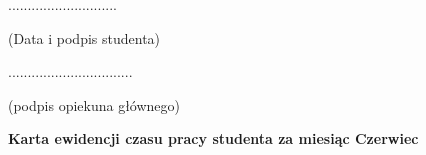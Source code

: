 \documentclass[a4paper,12pt]{article}
\begin{document}
\vfill

\begin{minipage}{4cm}
............................

\scriptsize{(Data i podpis studenta)}
\end{minipage}
\hfill
\begin{minipage}{4cm}
................................

\scriptsize{(podpis opiekuna głównego)}
\end{minipage}

\vspace{5mm}

\clearpage



\begin{center}
    \textbf{Karta ewidencji czasu pracy studenta za miesiąc Czerwiec }
\end{center}
\vspace{-5mm}

\vfill
\end{document}
